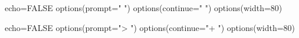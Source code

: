 \begin{Scode}{echo=FALSE}
options(prompt=" ")
options(continue=" ")
options(width=80)
\end{Scode}




\begin{Scode}{echo=FALSE}
options(prompt="> ")
options(continue="+ ")
options(width=80)
\end{Scode}